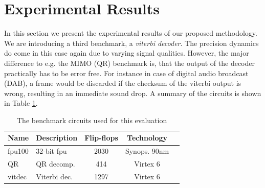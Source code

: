 \documentclass[10pt,twocolumn]{IEEEtran} %
\begin{document}
\section{\bf{Experimental Results}}
\label{sec:experimental_results}
In this section we present the experimental results of our proposed methodology. We are introducing a third benchmark, a \emph{viterbi decoder}. The precision dynamics do come in this case again due to varying signal qualities. However, the major difference to e.g. the MIMO (QR) benchmark is, that the output of the decoder practically has to be error free. For instance in case of digital audio broadcast (DAB), a frame would be discarded if the checksum of the viterbi output is wrong, resulting in an immediate sound drop. A summary of the circuits is shown in Table \ref{tab:benchmark_circuits}.
\begin{table}[htb]
\caption{The benchmark circuits used for this evaluation}
\label{tab:benchmark_circuits}
\centering
\begin{tabular} {| l | l | c | c | c |}
\hline
Name & Description  & Flip-flops & Technology\\
\hline\hline
fpu100 \cite{al2007fpu100} & 32-bit fpu & 2030 & Synops. 90nm\\
QR \cite{gimmler-dumont_asic_2013} & QR decomp.  & 414 & Virtex 6\\
vitdec \cite{fehrenz2014viterbi} & Viterbi dec.  & 1297 & Virtex 6\\
\hline
\end{tabular}
\end{table}
\end{document}
